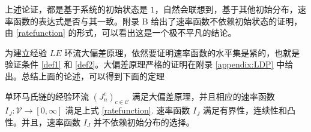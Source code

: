 上述论证，都是基于系统的初始状态是 $1$，自然会联想到，基于其他初始分布，速率函数的表达式是否与其一致。附录 B 给出了速率函数不依赖初始状态的证明，由 \eqref{ratefunction} 的形式，可以看出这是一个极不平凡的结论。

为建立经验 $LE$ 环流大偏差原理，依然要证明速率函数的水平集是紧的，也就是验证条件 \eqref{def1} 和 \eqref{def2}。大偏差原理严格的证明在附录 \ref{appendix:LDP} 中给出。总结上面的论述，可以得到下面的定理

\begin{theorem}\label{thm:LDP}
    单环马氏链的经验环流 $(J^c_n)_{c\in\mathcal{C}}$ 满足大偏差原理，并且相应的速率函数 $I_J:\mathcal{V}\to [0,\infty]$ 满足上式 \eqref{ratefunction}. 速率函数 $I_J$ 满足有界性，连续性和凸性。并且，速率函数 $I_J$ 并不依赖初始分布的选择。
\end{theorem}

